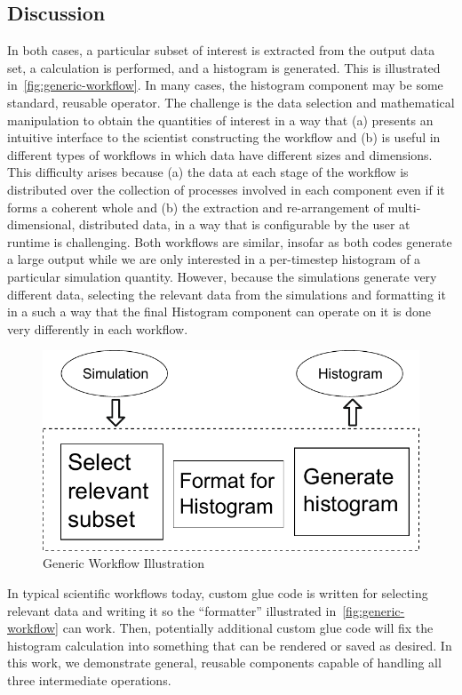 \documentclass[conference]{IEEEtran}
\begin{document}
\subsection{Discussion}

In both cases, a particular subset of interest is extracted from the
output data set, a calculation is performed, and a histogram is
generated. This is illustrated in~\autoref{fig:generic-workflow}. In many
cases, the histogram component may be some standard, reusable operator.
The challenge is the data selection and mathematical
manipulation to obtain the quantities of interest in a way that (a) presents an
intuitive interface to the scientist constructing the workflow and (b) is
useful in different types of workflows in which data have different sizes and
dimensions.  This difficulty arises because (a) the data at each stage of the
workflow is distributed over the collection of processes involved in each
component even if it forms a coherent whole and (b) the extraction and
re-arrangement of multi-dimensional, distributed data, in a way that is
configurable by the user at runtime is challenging.  Both workflows are
similar, insofar as both codes generate a large output while we are only
interested in a per-timestep histogram of a particular simulation quantity.
However, because the simulations generate very different data, selecting the
relevant data from the simulations and formatting it in a such a way that the
final Histogram component can operate on it is done very differently in each
workflow.

\begin{figure}[htbp]
  \vspace{-0.1in}
  \centering
  \includegraphics[width=0.7\columnwidth]{fig/gwflow}
  \vspace{-0.09in}
  \caption{Generic Workflow Illustration}
  \label{fig:generic-workflow}
  \vspace{-0.10in}
\end{figure}

In typical scientific workflows today, custom glue code is written for
selecting relevant data and writing it so the ``formatter'' illustrated in~\autoref{fig:generic-workflow} can work.  Then, potentially additional
custom glue code will fix the histogram calculation into something that can be
rendered or saved as desired.  In this work, we demonstrate general, reusable
components capable of handling all three intermediate operations.
\end{document}

